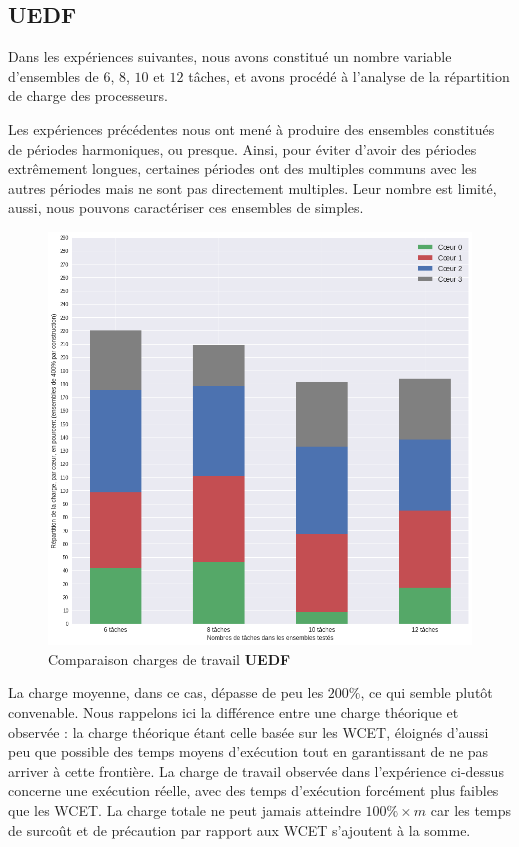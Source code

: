	\subsection{UEDF}
	Dans les expériences suivantes, nous avons constitué un nombre variable d'ensembles de $6$, $8$, $10$ et $12$ tâches, 
	et avons procédé à l'analyse de la répartition de charge des processeurs.\newline
	
	Les expériences précédentes nous ont mené à produire des ensembles constitués de 
	périodes harmoniques, ou \og{}presque\fg{}. Ainsi, pour éviter d'avoir des 
	périodes extrêmement longues, certaines périodes ont des multiples communs 
	avec les autres périodes mais ne sont pas directement multiples. Leur nombre est limité, aussi, nous pouvons 
	caractériser ces ensembles de \og{}simples\fg{}.\newline

	\begin{figure}[H]
		\label{loadevolution}
		\caption{Comparaison charges de travail \textbf{UEDF}}
		\includegraphics[scale=0.5]{img/wcet/repartitiondecharges_uedf}
	\end{figure}		
	
	La charge moyenne, dans ce cas, dépasse de peu les $200\%$, ce qui semble plutôt convenable. 
	Nous rappelons ici la différence entre une charge théorique et observée : 
	la charge théorique étant celle basée sur les WCET, éloignés d'aussi peu que possible des temps moyens d'exécution 
	tout en garantissant de ne pas arriver à cette frontière. La charge de travail observée dans l'expérience ci-dessus 
	concerne une exécution réelle, avec des temps d'exécution forcément plus faibles que les WCET. La charge totale 
	ne peut jamais atteindre $100\% \times m$ car les temps de surcoût et de \og{}précaution\fg{} par rapport aux WCET 
	s'ajoutent à la somme. \newline
	
